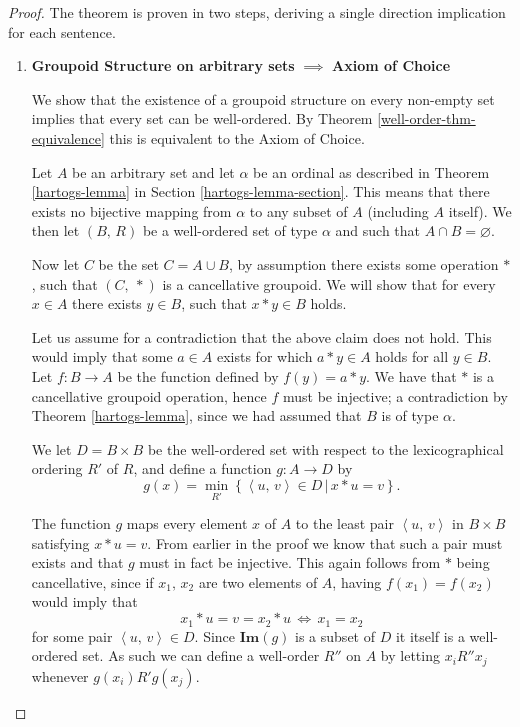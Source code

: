 \documentclass[../../main.tex]{subfiles}
\begin{document}
\begin{proof}
    The theorem is proven in two steps, deriving a single direction implication for each sentence.
    \begin{enumerate}
        \item \textbf{Groupoid Structure on arbitrary sets} $\implies$ \textbf{Axiom of Choice}
        
        We show that the existence of a groupoid structure on every non-empty set implies that every set can be well-ordered.
        By Theorem \ref{well-order-thm-equivalence} this is equivalent to the Axiom of Choice.

        Let $A$ be an arbitrary set and let $\alpha$ be an ordinal as described in Theorem \ref{hartogs-lemma} in Section \ref{hartogs-lemma-section}.
        This means that there exists no bijective mapping from $\alpha$ to any subset of $A$ (including $A$ itself).
        We then let $\left(B,\, R\right)$ be a well-ordered set of type $\alpha$ and such that $A \cap B = \varnothing$.
    
        Now let $C$ be the set $C = A \cup B$, by assumption there exists some operation $*$, such that $\left(C,\ *\right)$ is a cancellative groupoid. %
        We will show that for every $x \in A$ there exists $y \in B$, such that $x * y \in B$ holds.

        Let us assume for a contradiction that the above claim does not hold.
        This would imply that some $a \in A$ exists for which $a * y \in A$ holds for all $y \in B$.
        Let $f: B \to A$ be the function defined by $f(y) = a * y$.
        We have that $*$ is a cancellative groupoid operation, hence $f$ must be injective;
        a contradiction by Theorem \ref{hartogs-lemma}, since we had assumed that $B$ is of type $\alpha$.

        We let $D = B \times B$ be the well-ordered set with respect to the lexicographical ordering $R'$ of $R$,
        and define a function $g: A \to D$ by $$g(x) = \min_{R'} \left\{\left<u,\, v\right> \in D \,\vert\, x * u = v\right\}.$$
        
        The function $g$ maps every element $x$ of $A$ to the least pair $\left<u,\, v\right>$ in $B \times B$ satisfying $x * u = v$.
        From earlier in the proof we know that such a pair must exists and that $g$ must in fact be injective.
        This again follows from $*$ being cancellative, since if $x_1,\, x_2$ are two elements of $A$, having $f(x_1) = f(x_2)$ would imply that
        $$x_1 * u = v = x_2 * u \, \iff \, x_1 = x_2$$
        for some pair $\left<u,\, v\right> \in D$.
        Since $\mathbf{Im}(g)$ is a subset of $D$ it itself is a well-ordered set.
        As such we can define a well-order $R''$ on $A$ by letting $x_i R'' x_j$ whenever $g(x_i) R' g(x_j)$.


\end{enumerate}
\end{proof}
\end{document}
